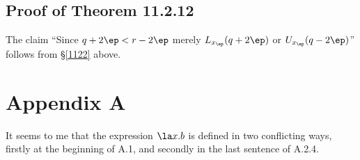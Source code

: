 \documentclass[12pt]{article}
\begin{document}
\subsection{Proof of Theorem 11.2.12}

The claim ``Since $q+2\ep<r-2\ep$ merely $L_{x_\ep}(q+2\ep)$ or $U_{x_\ep}(q-2\ep)$'' follows from \S\ref{1122} above.


\section{Appendix A}

It seems to me that the expression $\la x.b$ is defined in two conflicting ways, firstly at the beginning of A.1, and secondly in the last sentence of A.2.4. 
\end{document}

